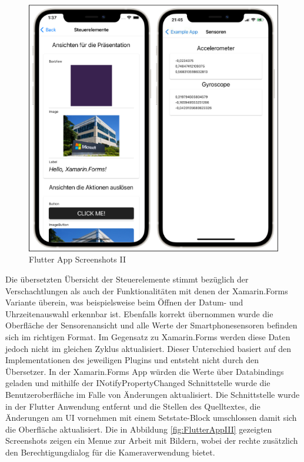\begin{figure}[!ht]
 \includegraphics[width=\textwidth,keepaspectratio]{Images/Screenshot/Sensors.png}
 \caption{Flutter App Screenshots II}
 \label{fig:FlutterAppII}
\end{figure}
Die übersetzten Übersicht der Steuerelemente stimmt  bezüglich der Verschachtlungen als auch der Funktionalitäten mit denen der Xamarin.Forms Variante überein,  was beispielsweise beim Öffnen der Datum- und Uhrzeitenauswahl erkennbar ist. Ebenfalls korrekt übernommen wurde die Oberfläche der Sensorenansicht und alle Werte der Smartphonesensoren befinden sich im richtigen Format. Im Gegensatz zu Xamarin.Forms werden diese Daten jedoch nicht im gleichen Zyklus aktualisiert.  Dieser Unterschied basiert auf den Implementationen des jeweiligen Plugins und entsteht nicht durch den Übersetzer.  In der Xamarin.Forms App würden die Werte über Databindings geladen und mithilfe der INotifyPropertyChanged Schnittstelle wurde die Benutzeroberfläche im Falle von Änderungen aktualisiert.  Die Schnittstelle wurde in der Flutter Anwendung entfernt und die Stellen des Quelltextes, die Änderungen am UI vornehmen mit einem Setstate-Block umschlossen damit sich die Oberfläche aktualisiert.  Die in Abbildung \ref{fig:FlutterAppIII}   gezeigten Screenshots zeigen ein Menue zur Arbeit mit Bildern, wobei der rechte zusätzlich den Berechtigungdialog für die Kameraverwendung bietet. 


